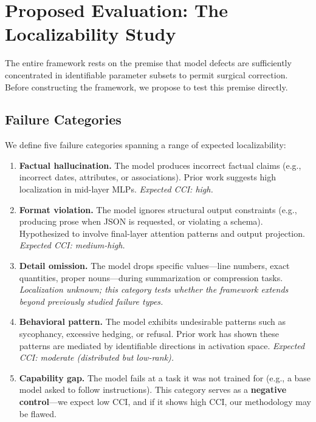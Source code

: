 \documentclass[11pt]{article}
\begin{document}
\section{Proposed Evaluation: The Localizability Study}
\label{sec:eval}

The entire framework rests on the premise that model defects are sufficiently concentrated in identifiable parameter subsets to permit surgical correction. Before constructing the framework, we propose to test this premise directly.

\subsection{Failure Categories}

We define five failure categories spanning a range of expected localizability:

\begin{enumerate}[leftmargin=*]
  \item \textbf{Factual hallucination.} The model produces incorrect factual claims (e.g., incorrect dates, attributes, or associations). Prior work suggests high localization in mid-layer MLPs. \emph{Expected CCI: high.}
  \item \textbf{Format violation.} The model ignores structural output constraints (e.g., producing prose when JSON is requested, or violating a schema). Hypothesized to involve final-layer attention patterns and output projection. \emph{Expected CCI: medium-high.}
  \item \textbf{Detail omission.} The model drops specific values---line numbers, exact quantities, proper nouns---during summarization or compression tasks. \emph{Localization unknown; this category tests whether the framework extends beyond previously studied failure types.}
  \item \textbf{Behavioral pattern.} The model exhibits undesirable patterns such as sycophancy, excessive hedging, or refusal. Prior work \citep{arditi2024refusal} has shown these patterns are mediated by identifiable directions in activation space. \emph{Expected CCI: moderate (distributed but low-rank).}
  \item \textbf{Capability gap.} The model fails at a task it was not trained for (e.g., a base model asked to follow instructions). This category serves as a \textbf{negative control}---we expect low CCI, and if it shows high CCI, our methodology may be flawed.
\end{enumerate}
\end{document}
